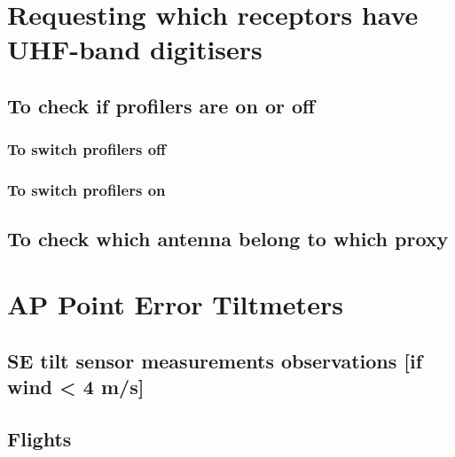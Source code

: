 \section{Requesting which receptors have UHF-band digitisers}


\subsection{To check if profilers are on or off}
\subsubsection{To switch profilers off}
\subsubsection{To switch profilers on}
\subsection{To check which antenna belong to which proxy}
\section{AP Point Error Tiltmeters}
\subsection{SE tilt sensor measurements observations [if wind < 4 m/s]}
\subsection{Flights}



	